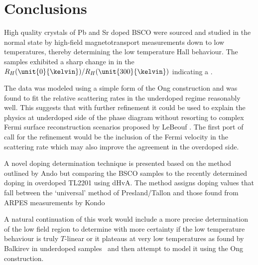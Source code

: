 
\section{Conclusions}

High quality crystals of Pb and Sr doped \ac{BSCO} were sourced and studied in the normal state by high-field magnetotransport measurements down to low temperatures, thereby determining the low temperature Hall behaviour. The samples exhibited a sharp change in in the $R_H(\unit{0}{\kelvin})/R_H(\unit{300}{\kelvin})$ indicating a .

The data was modeled using a simple form of the Ong construction and was found to fit the relative scattering rates in the underdoped regime reasonably well. This suggests that with further refinement it could be used to explain the physics at underdoped side of the phase diagram without resorting to complex Fermi surface reconstruction scenarios proposed by LeBeouf \etal. The first port of call for the refinement would be the inclusion of the Fermi velocity in the scattering rate which may also improve the agreement in the overdoped side.

A novel doping determination technique is presented based on the method outlined by Ando \etal but comparing the \ac{BSCO} samples to the recently determined doping in overdoped \ac{TL2201} using \ac{dHvA}. The method assigns doping values that fall between the `universal' method of Presland/Tallon and those found from \ac{ARPES} measurements by Kondo \etal

A natural continuation of this work would include a more precise determination of the low field region to determine with more certainty if the low temperature behaviour is truly $T$-linear or it plateaus at very low temperatures as found by Balkirev \etal in underdoped samples~\cite{Balakirev2003} and then attempt to model it using the Ong construction.
